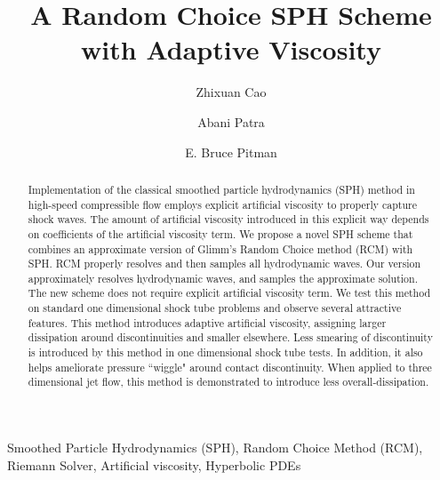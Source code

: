 \documentclass[preprint,12pt,authoryear]{elsarticle}
\begin{document}
\begin{frontmatter}
\title{A Random Choice SPH Scheme with Adaptive Viscosity}
\author{Zhixuan Cao}
\address{Fluids Business Unit, Ansys Inc., Lebanon, NH, 03766, USA}
\author{Abani Patra }
\address{Department of Computer Science and Department of Mathematics, Tufts University, Medford, MA, 02153, USA}
\author{E. Bruce Pitman}
\address{Department of Materials Design and Innovation, The State University of New York at Buffalo, Amherst, NY, 14260, USA}

\begin{abstract}
Implementation of the classical smoothed particle hydrodynamics (SPH) method in high-speed compressible flow employs explicit artificial viscosity to properly capture shock waves. The amount of artificial viscosity introduced in this explicit way depends on coefficients of the artificial viscosity term.
We propose a novel SPH scheme that combines an approximate version of Glimm\rq{}s Random Choice method (RCM) with SPH. RCM properly resolves and then samples all hydrodynamic waves. Our version approximately resolves hydrodynamic waves, and samples the approximate solution. The new scheme does not require explicit artificial viscosity term.
We test this method on standard one dimensional shock tube problems and observe several attractive features. This method introduces adaptive artificial viscosity, assigning larger dissipation around discontinuities and smaller elsewhere.  Less smearing of discontinuity is introduced by this method in one dimensional shock tube tests. In addition, it also helps ameliorate pressure ``wiggle" around contact discontinuity. When applied to three dimensional jet flow, this method is demonstrated to introduce less overall-dissipation.

\end{abstract}
\begin{keyword}
Smoothed Particle Hydrodynamics (SPH), Random Choice Method (RCM), Riemann Solver, Artificial viscosity, Hyperbolic PDEs
\end{keyword}
\end{frontmatter}
\end{document}
